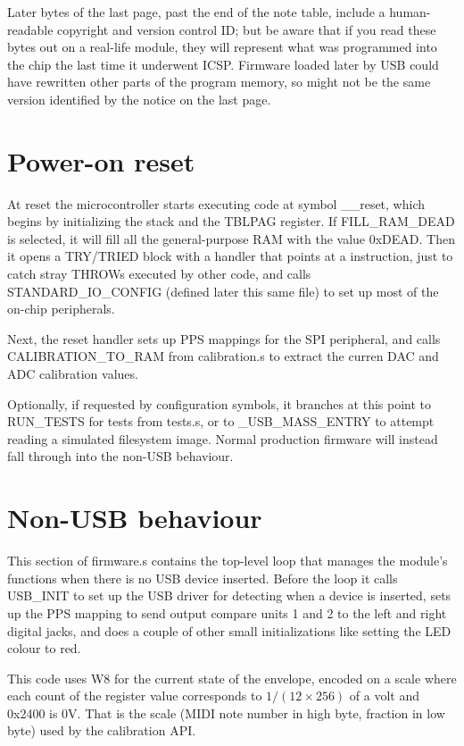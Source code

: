 Later bytes of the last page, past the end of the note table, include a
human-readable copyright and version control ID; but be aware that if you
read these bytes out on a real-life module, they will represent what was
programmed into the chip the last time it underwent ICSP.  Firmware loaded
later by USB could have rewritten other parts of the program memory, so
might not be the same version identified by the notice on the last page.

\section{Power-on reset}

At reset the microcontroller starts executing code at symbol \_\_reset,
which begins by initializing the stack and the TBLPAG register.  If
FILL\_RAM\_DEAD is selected, it will fill all the general-purpose RAM with
the value 0xDEAD.  Then it opens a TRY/TRIED block with a handler that
points at a  instruction, just to catch stray THROWs executed by
other code, and calls STANDARD\_IO\_CONFIG (defined later this same file) to
set up most of the on-chip peripherals.

Next, the reset handler sets up PPS mappings for the SPI peripheral, and
calls CALIBRATION\_TO\_RAM from calibration.s to extract the curren DAC and
ADC calibration values.

Optionally, if requested by configuration symbols, it branches at this point
to RUN\_TESTS for tests from tests.s, or to \_USB\_MASS\_ENTRY to attempt
reading a simulated filesystem image.  Normal production firmware will
instead fall through into the non-USB behaviour.

\section{Non-USB behaviour}

This section of firmware.s contains the top-level loop that manages the
module's functions when there is no USB device inserted.  Before the loop it
calls USB\_INIT to set up the USB driver for detecting when a device is
inserted, sets up the PPS mapping to send output compare units 1 and 2 to
the left and right digital jacks, and does a couple of other small
initializations like setting the LED colour to red.

This code uses W8 for the current state of the envelope, encoded on a scale
where each count of the register value corresponds to $1/(12\times 256)$ of
a volt and 0x2400 is 0V.  That is the scale (MIDI note number in high byte,
fraction in low byte) used by the calibration API.


